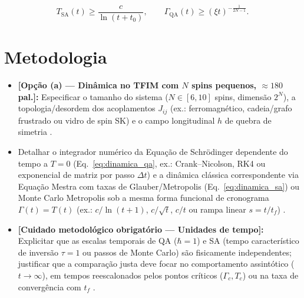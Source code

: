 \documentclass[aps,pre,twocolumn,10pt,superscriptaddress,nofootinbib]{revtex4-2}
\begin{document}
\begin{equation}
  T_{\text{SA}}(t) \ge \frac{c}{\ln(t + t_0)}, \qquad
  \Gamma_{\text{QA}}(t) \ge (\xi t)^{-\frac{1}{2N-1}}.
  \label{eq:cronogramas}
\end{equation}

\section{Metodologia}
\label{sec:metodologia}


\begin{itemize}
  \item \textbf{[Opção (a) --- Dinâmica no TFIM com $N$ spins pequenos, $\approx 180$ pal.]:}
        Especificar o tamanho do sistema ($N \in [6,10]$ spins, dimensão $2^N$), a topologia/desordem dos acoplamentos $J_{ij}$ (ex.: ferromagnético, cadeia/grafo frustrado ou vidro de spin SK) e o campo longitudinal $h$ de quebra de simetria \cite{Kadowaki1998}.
  \item Detalhar o integrador numérico da Equação de Schrödinger dependente do tempo a $T=0$ (Eq.~\eqref{eq:dinamica_qa}, ex.: Crank--Nicolson, RK4 ou exponencial de matriz por passo $\Delta t$) e a dinâmica clássica correspondente via Equação Mestra com taxas de Glauber/Metropolis (Eq.~\eqref{eq:dinamica_sa}) ou Monte Carlo Metropolis sob a mesma forma funcional de cronograma $\Gamma(t) = T(t)$ (ex.: $c/\ln(t+1)$, $c/\sqrt{t}$, $c/t$ ou rampa linear $s=t/t_f$) \cite{Kadowaki1998}.
  \item \textbf{[Cuidado metodológico obrigatório --- Unidades de tempo]:}
        Explicitar que as escalas temporais de QA ($\hbar = 1$) e SA (tempo característico de inversão $\tau = 1$ ou passos de Monte Carlo) são fisicamente independentes; justificar que a comparação justa deve focar no comportamento assintótico ($t \to \infty$), em tempos reescalonados pelos pontos críticos ($\Gamma_c, T_c$) ou na taxa de convergência com $t_f$ \cite{Kadowaki1998}.
\end{itemize}
\end{document}
